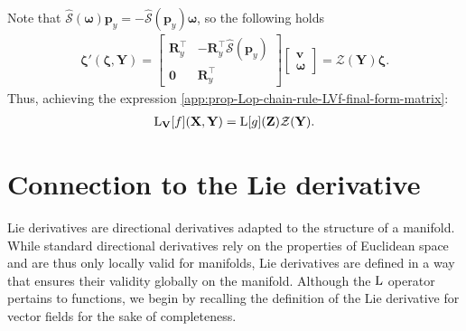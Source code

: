 Note that $\widehat{\mathcal{S}}(\boldsymbol{\omega})\mathbf{p}_y = -\widehat{\mathcal{S}}(\mathbf{p}_y)\boldsymbol{\omega}$, so the following holds
\begin{align}
    \boldsymbol{\zeta}'(\boldsymbol{\zeta}, \mathbf{Y}) = \begin{bmatrix}
        \mathbf{R}_y^\top & -\mathbf{R}_y^\top\widehat{\mathcal{S}}(\mathbf{p}_y)\\
        \mathbf{0} & \mathbf{R}_y^\top
    \end{bmatrix}\begin{bmatrix}
        \mathbf{v}\\ \boldsymbol{\omega}
    \end{bmatrix}
    = \mathcal{Z}(\mathbf{Y})\boldsymbol{\zeta}.
\end{align}
Thus, achieving the expression \eqref{app:prop-Lop-chain-rule-LVf-final-form-matrix}:
\begin{align}
    \operatorname{L}_\mathbf{V}[f](\mathbf{X}, \mathbf{Y}) = \operatorname{L}[g](\mathbf{Z})\mathcal{Z}(\mathbf{Y}). \label{eq:appendix-prop-Lop-chain-rule-SE3}
\end{align}

\section{Connection to the Lie derivative}
Lie derivatives are directional derivatives adapted to the structure of a manifold. While standard directional derivatives rely on the properties of Euclidean space and are thus only locally valid for manifolds, Lie derivatives are defined in a way that ensures their validity globally on the manifold. Although the $\operatorname{L}$ operator pertains to functions, we begin by recalling the definition of the Lie derivative for vector fields for the sake of completeness.

